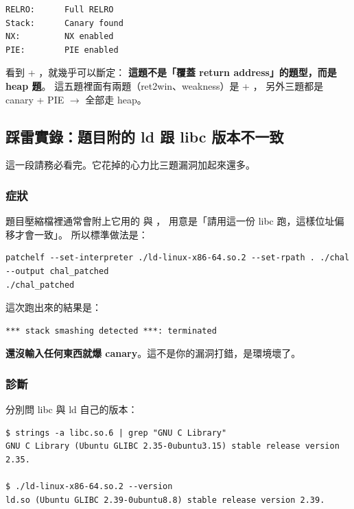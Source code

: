 \begin{lstlisting}[style=raw]
RELRO:      Full RELRO
Stack:      Canary found
NX:         NX enabled
PIE:        PIE enabled
\end{lstlisting}

看到  + ，就幾乎可以斷定：
\textbf{這題不是「覆蓋 return address」的題型，而是 heap 題}。
這五題裡面有兩題（ret2win、weakness）是  + ，
另外三題都是 canary + PIE $\rightarrow$ 全部走 heap。

\subsection{踩雷實錄：題目附的 ld 跟 libc 版本不一致}
\label{sec:toolchain}

這一段請務必看完。它花掉的心力比三題漏洞加起來還多。

\subsubsection{症狀}

題目壓縮檔裡通常會附上它用的  與 ，
用意是「請用這一份 libc 跑，這樣位址偏移才會一致」。
所以標準做法是：

\begin{lstlisting}[style=sh]
patchelf --set-interpreter ./ld-linux-x86-64.so.2 --set-rpath . ./chal --output chal_patched
./chal_patched
\end{lstlisting}

這次跑出來的結果是：

\begin{lstlisting}[style=raw]
*** stack smashing detected ***: terminated
\end{lstlisting}

\textbf{還沒輸入任何東西就爆 canary}。這不是你的漏洞打錯，是環境壞了。

\subsubsection{診斷}

分別問 libc 與 ld 自己的版本：

\begin{lstlisting}[style=sh]
$ strings -a libc.so.6 | grep "GNU C Library"
GNU C Library (Ubuntu GLIBC 2.35-0ubuntu3.15) stable release version 2.35.

$ ./ld-linux-x86-64.so.2 --version
ld.so (Ubuntu GLIBC 2.39-0ubuntu8.8) stable release version 2.39.
\end{lstlisting}

